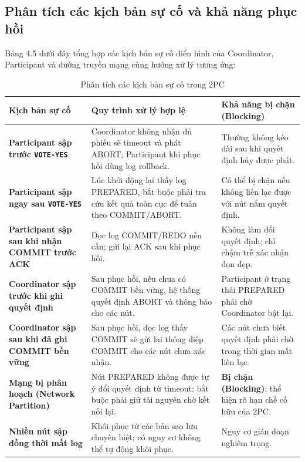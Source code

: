\documentclass[12pt,a4paper]{report}
\begin{document}
\subsection{Phân tích các kịch bản sự cố và khả năng phục hồi}
Bảng 4.5 dưới đây tổng hợp các kịch bản sự cố điển hình của Coordinator, Participant và đường truyền mạng cùng hướng xử lý tương ứng:

\begin{table}[H]
\centering
\small
\label{tab:2pc_failure_scenarios}
\renewcommand{\arraystretch}{1.2}
\begin{tabularx}{\textwidth}{|>{\raggedright\arraybackslash\bfseries}p{3.8cm}|>{\raggedright\arraybackslash}X|>{\raggedright\arraybackslash}p{3.2cm}|}
\hline
\textbf{Kịch bản sự cố} & \textbf{Quy trình xử lý hợp lệ} & \textbf{Khả năng bị chặn (Blocking)} \\ \hline
Participant sập trước \texttt{VOTE-YES} & Coordinator không nhận đủ phiếu sẽ timeout và phát ABORT; Participant khi phục hồi dùng log rollback. & Thường không kéo dài sau khi quyết định hủy được phát. \\ \hline
Participant sập ngay sau \texttt{VOTE-YES} & Lúc khởi động lại thấy log PREPARED, bắt buộc phải tra cứu kết quả toàn cục để tuân theo COMMIT/ABORT. & Có thể bị chặn nếu không liên lạc được với nút nắm quyết định. \\ \hline
Participant sập sau khi nhận COMMIT trước ACK & Đọc log COMMIT/REDO nếu cần; gửi lại ACK sau khi phục hồi. & Không làm đổi quyết định; chỉ chậm trễ xác nhận dọn dẹp. \\ \hline
Coordinator sập trước khi ghi quyết định & Sau phục hồi, nếu chưa có COMMIT bền vững, hệ thống quyết định ABORT và thông báo cho các nút. & Participant ở trạng thái PREPARED phải chờ Coordinator bật lại. \\ \hline
Coordinator sập sau khi đã ghi COMMIT bền vững & Sau phục hồi, đọc log thấy COMMIT sẽ gửi lại thông điệp COMMIT cho các nút chưa xác nhận. & Các nút chưa biết quyết định phải chờ trong thời gian mất liên lạc. \\ \hline
Mạng bị phân hoạch (Network Partition) & Nút PREPARED không được tự ý đổi quyết định từ timeout; bắt buộc phải giữ tài nguyên chờ kết nối lại. & \textbf{Bị chặn (Blocking)}; thể hiện rõ hạn chế cố hữu của 2PC. \\ \hline
Nhiều nút sập đồng thời mất log & Khôi phục từ các bản sao lưu chuyên biệt; có nguy cơ không thể tự động khôi phục. & Nguy cơ gián đoạn nghiêm trọng. \\ \hline
\end{tabularx}
\caption{Phân tích các kịch bản sự cố trong 2PC}
\end{table}
\end{document}
